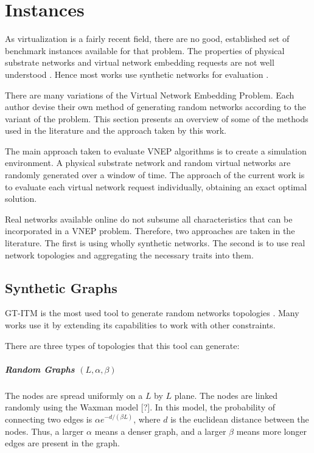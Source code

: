 \chapter{Instances}
\label{Instances}

As virtualization is a fairly recent field, there are no good, established set of benchmark instances available for that problem. The properties of physical substrate networks and virtual network embedding requests are not well understood \cite{Chowdhury:2012}. Hence most works use synthetic networks for evaluation \cite{FischerSurvey}. 

There are many variations of the Virtual Network Embedding Problem. Each author devise their own method of generating random networks according to the variant of the problem. This section presents an overview of some of the methods used in the literature and the approach taken by this work.

The main approach taken to evaluate VNEP algorithms is to create a simulation environment. A physical substrate network and random virtual networks are randomly generated over a window of time. The approach of the current work is to evaluate each virtual network request individually, obtaining an exact optimal solution. 

Real networks available online do not subsume all characteristics that can be incorporated in a VNEP problem. Therefore, two approaches are taken in the literature. The first is using wholly synthetic networks. The second is to use real network topologies and aggregating the necessary traits into them.

\section{Synthetic Graphs}
GT-ITM is the most used tool to generate random networks topologies \cite{Fischer}. Many works use it by extending its capabilities to work with other constraints.

There are three types of topologies that this tool can generate:

\paragraph{Random Graphs $(L, \alpha, \beta)$}  The nodes are spread uniformly on a $L$ by $L$ plane. The nodes are linked randomly using the Waxman model [?]. In this model, the probability of connecting two edges is $ \alpha e^{- d / (\beta L) }$, where $d$ is the euclidean distance between the nodes. Thus, a larger $\alpha$ means a denser graph, and a larger $\beta$ means more longer edges are present in the graph.

